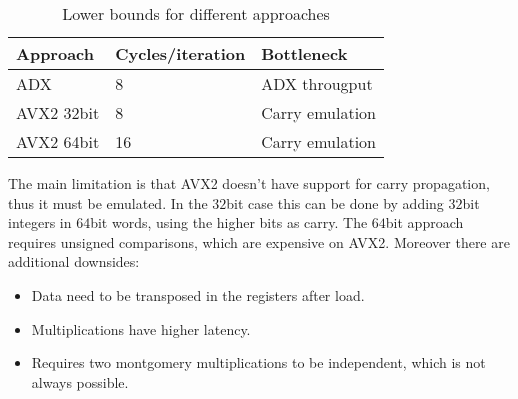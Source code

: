 \begin{table}
\centering
\caption{Lower bounds for different approaches}
\label{tbl-adx-avx2}
\begin{tabular}{ l l l}
	\hline
 	Approach & Cycles/iteration & Bottleneck \\ \hline
 	ADX & 8 & ADX througput \\
  	AVX2 32bit & 8 & Carry emulation \\
 	AVX2 64bit & 16 & Carry emulation \\ \hline
\end{tabular}
\end{table}

The main limitation is that AVX2 doesn't have support for carry propagation, thus it must be emulated. In the $32$bit case this can be done by adding $32$bit integers in $64$bit words, using the higher bits as carry. The $64$bit approach requires unsigned comparisons, which are expensive on AVX2. Moreover there are additional downsides:
\begin{itemize}
\item Data need to be transposed in the registers after load.
\item Multiplications have higher latency.
\item Requires two montgomery multiplications to be independent, which is not always possible.
\end{itemize}
